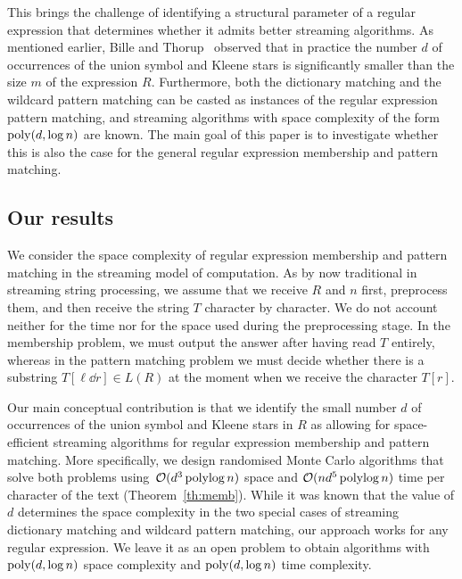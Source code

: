 This brings the challenge of identifying a structural parameter of a regular expression that determines whether it admits better
streaming algorithms.
As mentioned earlier, Bille and Thorup~\cite{doi:10.1137/1.9781611973075.104} observed that in practice  
the number $d$ of occurrences of the union symbol and Kleene stars is significantly smaller than the size $m$ of the expression $R$.
Furthermore, both the dictionary matching and the wildcard pattern matching can be casted
as instances of the regular expression pattern matching, and streaming algorithms with space complexity of the form~$\mathrm{poly}(d,\log n)$
are known. The main goal of this paper is to investigate whether this is also the case for the general
regular expression membership and pattern matching.

\subsection{Our results}
We consider the space complexity of regular expression membership and pattern matching in the streaming model of
computation. 
As by now traditional in streaming string processing, we assume that we receive $R$ and $n$ first, preprocess them, and then receive the string $T$ character by character. We do not account neither for the time nor for the space used during the preprocessing stage.
In the membership problem, we must output the answer after having read $T$ entirely, whereas in the pattern matching problem we must decide whether there is a substring $T[\ell \dd r] \in L(R)$ at the moment when we receive the character $T[r]$. 

Our main conceptual contribution is that we identify the small number $d$ of occurrences of the union symbol and Kleene stars
in $R$ as allowing for space-efficient streaming algorithms for regular expression membership and pattern matching.
More specifically, we design randomised Monte Carlo algorithms that solve both problems
using~$\mathcal{O}(d^3\operatorname{polylog} n)$ space and $\mathcal{O}(nd^5\operatorname{polylog} n)$ time per character of the text (Theorem~\ref{th:memb}).
While it was known that the value of $d$ determines the space complexity in the two special cases of
streaming dictionary matching and wildcard pattern matching, our approach works for any regular expression.
We leave it as an open problem to obtain algorithms with $\mathrm{poly}(d, \log n)$ space complexity and $\mathrm{poly}(d, \log n)$ time complexity. 

